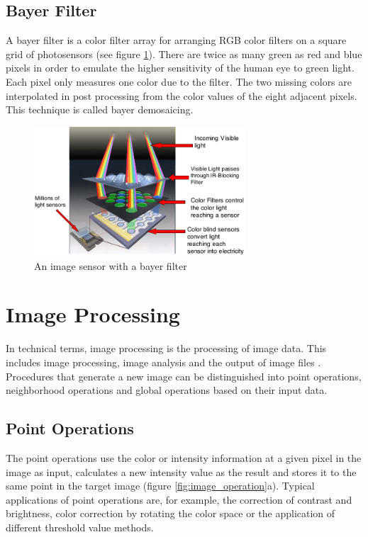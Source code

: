 \subsection{Bayer Filter}
A bayer filter is a color filter array for arranging RGB color filters on a
square grid of photosensors (see figure \ref{fig:image_sensor}). There are twice as many green as red and blue
pixels in order to emulate the higher sensitivity of the human eye to green
light. Each pixel only measures one color due to the filter. The two missing
colors are interpolated in post processing from the color values of the eight adjacent pixels.
This technique is called bayer demosaicing.
\begin{figure}[tb!]
    \centering
    \includegraphics[width=0.7\textwidth]{images/theory/image_sensor.png}
    \caption{An image sensor with a bayer filter \cite{image_sensor}}
    \label{fig:image_sensor}
\end{figure}

%
%
\section{Image Processing} \label{chapt:theroy_imageprocessing}
In technical terms, image processing is the processing of image data. This
includes image processing, image analysis and the output of image files 
\cite{image_processing}. Procedures that generate a new image can be
distinguished into point operations, neighborhood operations and global operations based on their input data.

\subsection{Point Operations}
The point operations use the color or intensity information at a given pixel in the image as input, calculates a new intensity value as the result and stores it to the same point in the target image (figure \ref{fig:image_operation}a). Typical applications of point operations are, for example, the correction of contrast and brightness, color correction by rotating the color space or the application of different threshold value methods.

